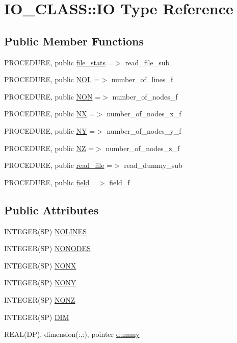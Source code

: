 \hypertarget{typeIO__CLASS_1_1IO}{
\section{IO\_\-CLASS::IO Type Reference}
\label{typeIO__CLASS_1_1IO}
}
\subsection*{Public Member Functions}
\begin{DoxyCompactItemize}
\item 
PROCEDURE, public \hyperlink{typeIO__CLASS_1_1IO_a4e7f9793856d178a294424a41956b06d}{file\_\-stats} =$>$ read\_\-file\_\-sub
\item 
PROCEDURE, public \hyperlink{typeIO__CLASS_1_1IO_a2a95f54a70215c2a7f4404998959e254}{NOL} =$>$ number\_\-of\_\-lines\_\-f
\item 
PROCEDURE, public \hyperlink{typeIO__CLASS_1_1IO_aa5e54a8b52ad93ea8db77b0aec13e628}{NON} =$>$ number\_\-of\_\-nodes\_\-f
\item 
PROCEDURE, public \hyperlink{typeIO__CLASS_1_1IO_ad813b656a5fa827ba84f34bd8f9b87bb}{NX} =$>$ number\_\-of\_\-nodes\_\-x\_\-f
\item 
PROCEDURE, public \hyperlink{typeIO__CLASS_1_1IO_aadc595d12b6ccecae3347240c9da9436}{NY} =$>$ number\_\-of\_\-nodes\_\-y\_\-f
\item 
PROCEDURE, public \hyperlink{typeIO__CLASS_1_1IO_ae711f2f0d918f3f40eacd0cd74ab29e4}{NZ} =$>$ number\_\-of\_\-nodes\_\-z\_\-f
\item 
PROCEDURE, public \hyperlink{typeIO__CLASS_1_1IO_ab7f25108ce89b8b8a037698b04449214}{read\_\-file} =$>$ read\_\-dummy\_\-sub
\item 
PROCEDURE, public \hyperlink{typeIO__CLASS_1_1IO_a31154428dde5e51b86a591977acab9f4}{field} =$>$ field\_\-f
\end{DoxyCompactItemize}
\subsection*{Public Attributes}
\begin{DoxyCompactItemize}
\item 
INTEGER(SP) \hyperlink{typeIO__CLASS_1_1IO_a3b70c5d8c06d577a282d4987fbdcfa5e}{NOLINES}
\item 
INTEGER(SP) \hyperlink{typeIO__CLASS_1_1IO_afb096dbfeea6075e4867273b2d2cd282}{NONODES}
\item 
INTEGER(SP) \hyperlink{typeIO__CLASS_1_1IO_a3fe805b71504c0d8d043bb0bc22b9ec1}{NONX}
\item 
INTEGER(SP) \hyperlink{typeIO__CLASS_1_1IO_a1259b785f9bba0ff1f11191b9f8a3b8d}{NONY}
\item 
INTEGER(SP) \hyperlink{typeIO__CLASS_1_1IO_ad396a56353638ec204e9fff5ae71202c}{NONZ}
\item 
INTEGER(SP) \hyperlink{typeIO__CLASS_1_1IO_ae4de46da7a025c4f4f8e8d6241418ee9}{DIM}
\item 
REAL(DP), dimension(:,:), pointer \hyperlink{typeIO__CLASS_1_1IO_a28657cb15afcf0b2725d64be12ab7c01}{dummy}
\end{DoxyCompactItemize}


